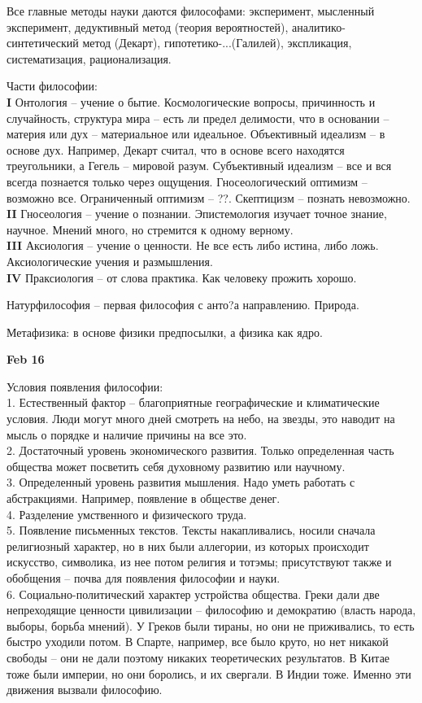 \documentclass[a4paper, 12pt]{article}
\def\t{\hspace*{1cm}}
\begin{document}
Все главные методы науки даются философами: эксперимент, мысленный эксперимент, дедуктивный метод (теория вероятностей), \linebreak аналитико-синтетический метод (Декарт), гипотетико-...(Галилей), экспликация, систематизация, рационализация.

Части философии:
\\\t \textbf{I} Онтология -- учение о бытие. Космологические вопросы, причинность и случайность, структура мира -- есть ли предел делимости, что в основании -- материя или дух -- материальное или идеальное. Объективный идеализм -- в основе дух. Например, Декарт считал, что в основе всего находятся треугольники, а Гегель -- мировой разум. Субъективный идеализм -- все и вся всегда познается только через ощущения. Гносеологический оптимизм -- возможно все. Ограниченный оптимизм -- ??. Скептицизм -- познать невозможно. 
\\\t \textbf{II} Гносеология -- учение о познании. Эпистемология изучает точное знание, научное. Мнений много, но стремится к одному верному. 
\\\t \textbf{III} Аксиология -- учение о ценности. Не все есть либо истина, либо ложь. Аксиологические учения и размышления.
\\\t \textbf{IV} Праксиология -- от слова практика. Как человеку прожить хорошо. 

Натурфилософия -- первая философия с анто?а направлению. Природа.

Метафизика: в основе физики предпосылки, а физика как ядро. 

\vspace{1cm}

\hfill	\textbf{Feb 16}


Условия появления философии:
\\\t 1. Естественный фактор -- благоприятные географические и климатические условия. Люди могут много дней смотреть на небо, на звезды, это наводит на мысль о порядке и наличие причины на все это. 
\\\t 2. Достаточный уровень экономического развития. Только определенная часть общества может посветить себя духовному развитию или научному. 
\\\t 3. Определенный уровень развития мышления. Надо уметь работать с абстракциями. Например, появление в обществе денег.
\\\t 4. Разделение умственного и физического труда. 
\\\t 5. Появление письменных текстов. Тексты накапливались, носили сначала религиозный характер, но в них были аллегории, из которых происходит искусство, символика, из нее потом религия и тотэмы; присутствуют также и обобщения -- почва для появления философии и науки. 
\\\t 6. Социально-политический характер устройства общества. Греки дали две непреходящие ценности цивилизации -- философию и демократию (власть народа, выборы, борьба мнений). У Греков были тираны, но они не приживались, то есть быстро уходили потом. В Спарте, например, все было круто, но нет никакой свободы -- они не дали поэтому никаких теоретических результатов. В Китае тоже были империи, но они боролись, и их свергали. В Индии тоже. Именно эти движения вызвали философию.
\end{document}
